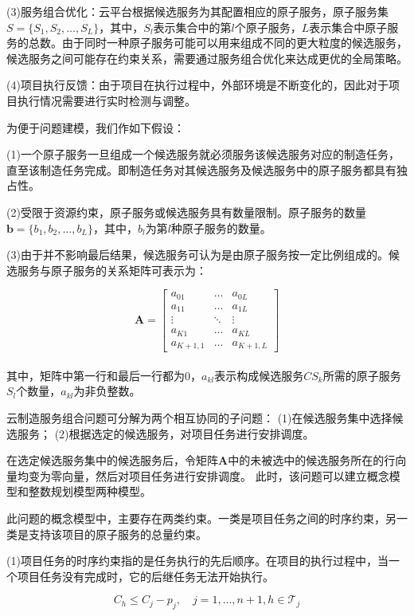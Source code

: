 \documentclass[UTF8]{ctexart}
\begin{document}
(3)服务组合优化：云平台根据候选服务为其配置相应的原子服务，原子服务集$S = \{S_1, S_2, \dots, S_L\}$，其中，$S_l$表示集合中的第$l$个原子服务，$L$表示集合中原子服务的总数。由于同时一种原子服务可能可以用来组成不同的更大粒度的候选服务，候选服务之间可能存在约束关系，需要通过服务组合优化来达成更优的全局策略。

(4)项目执行反馈：由于项目在执行过程中，外部环境是不断变化的，因此对于项目执行情况需要进行实时检测与调整。

为便于问题建模，我们作如下假设：

(1)一个原子服务一旦组成一个候选服务就必须服务该候选服务对应的制造任务，直至该制造任务完成。即制造任务对其候选服务及候选服务中的原子服务都具有独占性。

(2)受限于资源约束，原子服务或候选服务具有数量限制。原子服务的数量$\bm{b} = \{b_1, b_2, \dots, b_L\}$，其中，$b_l$为第$l$种原子服务的数量。

(3)由于并不影响最后结果，候选服务可认为是由原子服务按一定比例组成的。候选服务与原子服务的关系矩阵可表示为：

\[ \bm{A} = \begin{bmatrix}
a_{01} & \dots & a_{0L} \\
a_{11} & \dots & a_{1L} \\
\vdots & \ddots & \vdots \\
a_{K1} & \dots & a_{KL} \\
a_{K + 1, 1} & \dots & a_{K + 1, L}
\end{bmatrix} \]
\\
其中，矩阵中第一行和最后一行都为0，$a_{kl}$表示构成候选服务$CS_k$所需的原子服务$S_l$个数量，$a_{kl}$为非负整数。

云制造服务组合问题可分解为两个相互协同的子问题：
(1)在候选服务集中选择候选服务；
(2)根据选定的候选服务，对项目任务进行安排调度。

在选定候选服务集中的候选服务后，令矩阵$\bm{A}$中的未被选中的候选服务所在的行向量均变为零向量，然后对项目任务进行安排调度。
此时，该问题可以建立概念模型和整数规划模型两种模型。

此问题的概念模型中，主要存在两类约束。一类是项目任务之间的时序约束，另一类是支持该项目的原子服务的总量约束。

(1)项目任务的时序约束指的是任务执行的先后顺序。在项目的执行过程中，当一个项目任务没有完成时，它的后继任务无法开始执行。

\begin{equation}
\label{eq:con_seq}
C_h \leqslant C_j - p_j, \quad j = 1,\dots,n+1, h\in \mathcal{T}_j
\end{equation}
\end{document}
